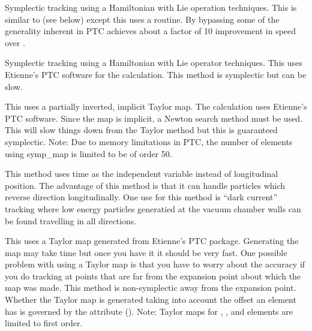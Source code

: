 \begin{description}
\item[\vn{Symp_Lie_Bmad}]
Symplectic tracking using a Hamiltonian with Lie operation techniques.
This is similar to  (see below) except this uses a
\bmad routine. By bypassing some of the generality inherent in PTC
 achieves about a factor of 10 improvement in speed over
.

\item[\vn{Symp_Lie_PTC}]
Symplectic tracking using a Hamiltonian with Lie operator techniques.
This uses Etienne's PTC software for the calculation. This method is
symplectic but can be slow.

\item[\vn{Symp_Map}]
This uses a partially inverted, implicit Taylor map. The calculation
uses Etienne's PTC software.  Since the map is implicit, a Newton
search method must be used. This will slow things down from the Taylor
method but this is guaranteed symplectic. Note: Due to memory limitations
in PTC, the number of elements using symp_map is limited to be of order 50.

\item[\vn{Symp_Map}]
This method uses time as the independent variable instead of
longitudinal position. The advantage of this method is that it can
handle particles which reverse direction longitudinally.  One use for
this method is ``dark current'' tracking where low energy particles
generatied at the vacuum chamber walls can be found travelling in all
directions.

\item[\vn{Taylor}]
This uses a Taylor map generated from Etienne's PTC
package. Generating the map may take time but once you have it it
should be very fast. One possible problem with using a Taylor map is
that you have to worry about the accuracy if you do tracking at points
that are far from the expansion point about which the map was
made. This method is non-symplectic away from the expansion
point. Whether the Taylor map is generated taking into account the
offset an element has is governed by the 
attribute (). Note: Taylor maps for , ,
and  elements are limited to first order.

\end{description}

